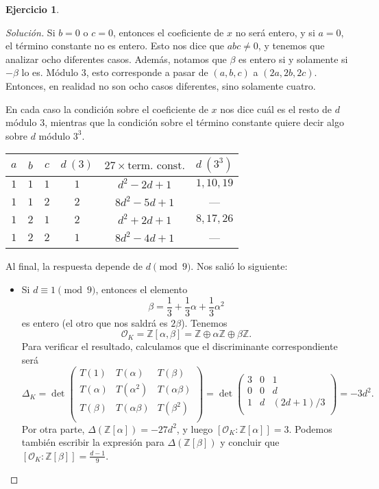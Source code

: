 \documentclass{article}
\newcounter{tarea}
\theoremstyle{definition}
\newtheorem{ejercicio}{Ejercicio}[tarea]
\newenvironment{solucion}{\begin{proof}[Solución]}{\end{proof}}
\newcommand{\ZZ}{\mathbb{Z}}
\renewcommand{\O}{\mathcal{O}}
\begin{document}
\begin{ejercicio}
\begin{solucion}
    Si $b = 0$ o $c = 0$, entonces el coeficiente de $x$ no será entero, y si
    $a = 0$, el término constante no es entero. Esto nos dice que $abc \ne 0$,
    y tenemos que analizar ocho diferentes casos. Además, notamos que $\beta$
    es entero si y solamente si $-\beta$ lo es. Módulo $3$, esto corresponde
    a pasar de $(a,b,c)$ a $(2a, 2b, 2c)$. Entonces, en realidad no son ocho
    casos diferentes, sino solamente cuatro.
    
    En cada caso la condición sobre el coeficiente de $x$ nos dice cuál es el
    resto de $d$ módulo $3$, mientras que la condición sobre el término
    constante quiere decir algo sobre $d$ módulo $3^3$.

    \begin{center}\renewcommand{\arraystretch}{1.5}
      \begin{tabular}{cccccc}
        $a$ & $b$ & $c$ & $d~(3)$ & $27\times\text{term. const.}$ & $d~(3^3)$ \\
        \hline
        $1$ & $1$ & $1$ & $1$ & $d^2 - 2d + 1$ & $1,10,19$ \\
        $1$ & $1$ & $2$ & $2$ & $8d^2 - 5d + 1$ & --- \\
        $1$ & $2$ & $1$ & $2$ & $d^2 + 2d + 1$ & $8, 17, 26$ \\
        $1$ & $2$ & $2$ & $1$ & $8d^2 - 4d + 1$ & --- \\
        \hline
      \end{tabular}
    \end{center}
    Al final, la respuesta depende de $d \pmod{9}$. Nos salió lo siguiente:
    \begin{itemize}
    \item Si $d \equiv 1 \pmod{9}$, entonces el elemento
      $$\beta = \frac{1}{3} + \frac{1}{3}\alpha + \frac{1}{3}\alpha^2$$
      es entero (el otro que nos saldrá es $2\beta$). Tenemos
      $$\O_K = \ZZ [\alpha,\beta] = \ZZ \oplus \alpha\ZZ \oplus \beta\ZZ.$$
      Para verificar el resultado, calculamos que el discriminante
      correspondiente será
      \[ \Delta_K = \det \begin{pmatrix}
        T (1) & T (\alpha) & T (\beta) \\
        T (\alpha) & T (\alpha^2) & T (\alpha\beta) \\
        T (\beta) & T (\alpha\beta) & T (\beta^2) \\
      \end{pmatrix} = \det \begin{pmatrix}
        3 & 0 & 1 \\
        0 & 0 & d \\
        1 & d & (2d+1)/3 \\
      \end{pmatrix} = -3d^2. \]
      Por otra parte,
      $\Delta (\ZZ [\alpha]) = -27 d^2$, y luego
      $[\O_K : \ZZ [\alpha]] = 3$. Podemos también escribir la expresión para
      $\Delta (\ZZ[\beta])$ y concluir que
      $[\O_K : \ZZ [\beta]] = \frac{d-1}{9}$.


\end{itemize}
\end{solucion}
\end{ejercicio}
\end{document}
